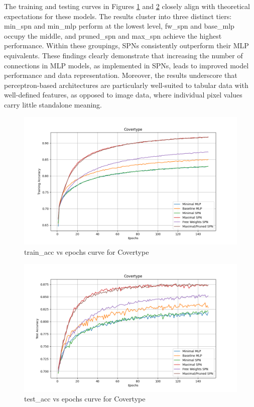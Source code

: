 The training and testing curves in Figures \ref{fig:covertypeTrainCurve} and \ref{fig:covertyoeTestCurve} closely align with theoretical expectations for these models. The results cluster into three distinct tiers: min\_spn and min\_mlp perform at the lowest level, fw\_spn and base\_mlp occupy the middle, and pruned\_spn and max\_spn achieve the highest performance. Within these groupings, SPNs consistently outperform their MLP equivalents. These findings clearly demonstrate that increasing the number of connections in MLP models, as implemented in SPNs, leads to improved model performance and data representation. Moreover, the results underscore that perceptron-based architectures are particularly well-suited to tabular data with well-defined features, as opposed to image data, where individual pixel values carry little standalone meaning.

\begin{figure}[H]
    \centering
    \includegraphics[width=\linewidth]{Figures/Results/Covertype/training_accuracy_plot.png} %
    \captionsetup{width=\linewidth}
    \caption{train\_acc vs epochs curve for Covertype}
    \label{fig:covertypeTrainCurve}
\end{figure}

\begin{figure}[H]
    \centering
    \includegraphics[width=\linewidth]{Figures/Results/Covertype/test_accuracy_plot.png} %
    \captionsetup{width=\linewidth}
    \caption{test\_acc vs epochs curve for Covertype}
    \label{fig:covertyoeTestCurve}
\end{figure}

